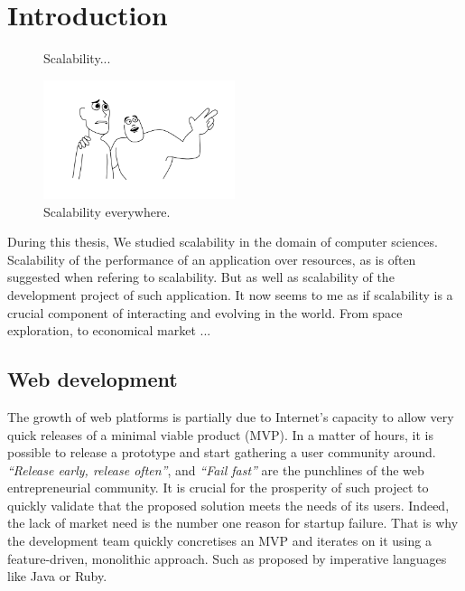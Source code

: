 \chapter{Introduction} \label{chapter:conclusion}



\begin{figure}

\fontencoding{\encodingdefault}%
  \vspace{-32pt}
  \begin{center}
    \caption*{\tiny{Scalability...}}
    \vspace{-30pt}
    \hspace*{-25pt}
    \includegraphics[width=0.5\textwidth]{../ressources/x-x-everywhere.png}
    \vspace{-40pt}
    \caption*{\tiny{Scalability everywhere.}}
  \end{center}
  \vspace{-40pt}
\end{figure}

During this thesis, We studied scalability in the domain of computer sciences.
Scalability of the performance of an application over resources, as is often suggested when refering to scalability.
But as well as scalability of the development project of such application.
It now seems to me as if scalability is a crucial component of interacting and evolving in the world.
From space exploration, to economical market ...


\section{Web development}

The growth of web platforms is partially due to Internet's capacity to allow very quick releases of a minimal viable product (MVP).
In a matter of hours, it is possible to release a prototype and start gathering a user community around.
\textit{``Release early, release often''}, and \textit{``Fail fast''} are the punchlines of the web entrepreneurial community.
It is crucial for the prosperity of such project to quickly validate that the proposed solution meets the needs of its users.
Indeed, the lack of market need is the number one reason for startup failure.
That is why the development team quickly concretises an MVP and iterates on it using a feature-driven, monolithic approach.
Such as proposed by imperative languages like Java or Ruby.

